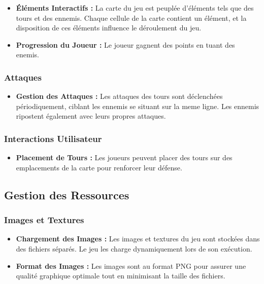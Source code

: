 \documentclass{article}
\begin{document}
\begin{itemize}
    \item \textbf{Éléments Interactifs :} La carte du jeu est peuplée d'éléments tels que des tours et des ennemis. Chaque cellule de la carte contient un élément, et la disposition de ces éléments influence le déroulement du jeu.

    \item \textbf{Progression du Joueur :} Le joueur gagnent des points en tuant des enemis.
\end{itemize}

\subsubsection*{Attaques}

\begin{itemize}
    \item \textbf{Gestion des Attaques :} Les attaques des tours sont déclenchées périodiquement, ciblant les ennemis se situant sur la meme ligne. Les ennemis ripostent également avec leurs propres attaques.
\end{itemize}

\subsubsection*{Interactions Utilisateur}

\begin{itemize}
    \item \textbf{Placement de Tours :} Les joueurs peuvent placer des tours sur des emplacements de la carte pour renforcer leur défense.
\end{itemize}

\subsection{Gestion des Ressources}

\subsubsection*{Images et Textures}

\begin{itemize}
    \item \textbf{Chargement des Images :} Les images et textures du jeu sont stockées dans des fichiers séparés. Le jeu les charge dynamiquement lors de son exécution.

    \item \textbf{Format des Images :} Les images sont au format PNG pour assurer une qualité graphique optimale tout en minimisant la taille des fichiers.
\end{itemize}
\end{document}
